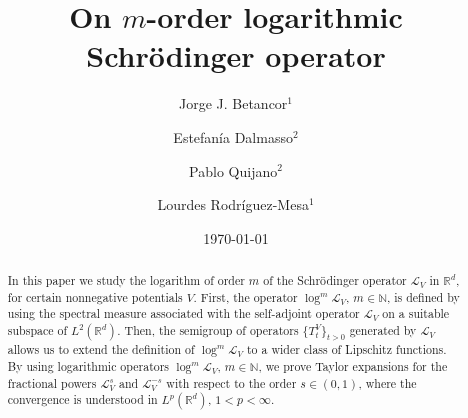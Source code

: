 \documentclass[10pt, a4paper, reqno]{amsart}
\theoremstyle{definition}
\theoremstyle{remark}
\numberwithin{equation}{section}
\begin{document}
	
	
	\title[On $m$-order logarithmic Schr\"odinger operator]
	{On $m$-order logarithmic Schr\"odinger operator}
	
	
	\author[J. J. Betancor]{Jorge J. Betancor$^1$}
        \address{$^1$Departamento de An\'alisis Matem\'atico, Universidad de La Laguna,\newline
	Campus de Anchieta, Avda. Astrof\'isico S\'anchez, s/n, La Laguna (Sta. Cruz de Tenerife), Spain}
	
	\author[E. Dalmasso]{Estefan\'ia Dalmasso$^{2}$}
	\address{$^2$Instituto de Matem\'atica Aplicada del Litoral, UNL, CONICET,     FIQ.\newline 
    Colectora Ruta Nac. Nº 168, Paraje El Pozo,\newline S3007ABA, Santa Fe, Argentina}
	
	\author[P. Quijano]{Pablo Quijano$^{2}$}

     \author[L. Rodríguez-Mesa]{Lourdes Rodríguez-Mesa$^1$}  
	
	\date{\today}
	\subjclass{}
	
	\keywords{}

\begin{abstract}
In this paper we study the logarithm of order $m$ of the Schr\"odinger operator $\mathcal L_V$ in $\mathbb R^d$, for certain nonnegative potentials $V$. First, the operator $\log^m\mathcal L_V$, $m\in \mathbb N$, is defined by using the spectral measure associated with the self-adjoint operator $\mathcal L_V$ on a suitable subspace of $L^2(\mathbb R^d)$. Then, the semigroup of operators $\{T_t^V\}_{t>0}$ generated by $\mathcal L_V$ allows us to extend the definition of $\log^m\mathcal L_V$ to a wider class of Lipschitz functions. By using logarithmic operators $\log^m\mathcal L_V$, $m\in \mathbb N$, we prove Taylor expansions for the fractional powers $\mathcal L_V^s$ and $\mathcal L_V^{-s}$ with respect to the order $s\in (0,1)$, where the convergence is understood in $L^p(\mathbb R^d)$, $1<p<\infty$.   
\end{abstract}

\maketitle
\end{document}
